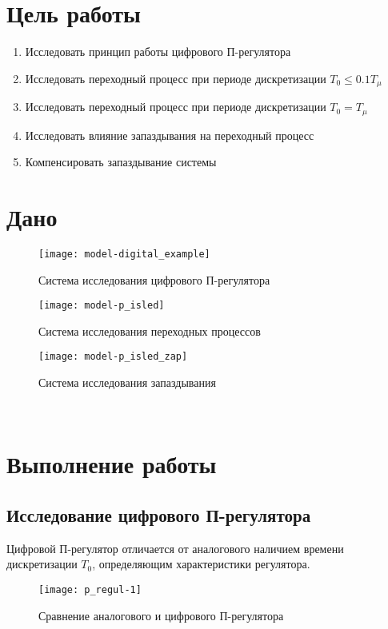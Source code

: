 


    
	\setcounter{page}{2}
    \section{Цель работы}
    \begin{enumerate}
        \item Исследовать принцип работы цифрового П-регулятора
        \item Исследовать переходный процесс при периоде дискретизации $T_0\leq0.1T_\mu$
        \item Исследовать переходный процесс при периоде дискретизации $T_0=T_\mu$
        \item Исследовать влияние запаздывания на переходный процесс
        \item Компенсировать запаздывание системы
    \end{enumerate}


    \section{Дано}
    \begin{figure}[H]
        \centering\texttt{[image: model-digital\_example]}
        \caption{Система исследования цифрового П-регулятора}
    \end{figure}
    \begin{figure}[H]
        \centering\texttt{[image: model-p\_isled]}
        \caption{Система исследования переходных процессов}
    \end{figure}
    \begin{figure}[H]
        \centering\texttt{[image: model-p\_isled\_zap]}
        \caption{Система исследования запаздывания}
    \end{figure}

    \begin{center}
        \noindent{}\\
    \end{center}


    \section{Выполнение работы}

    \subsection{Исследование цифрового П-регулятора}
    Цифровой П-регулятор отличается от аналогового наличием времени дискретизации $T_0$,
    определяющим характеристики регулятора.
    \begin{figure}[H]
        \centering\texttt{[image: p\_regul-1]}
        \caption{Сравнение аналогового и цифрового П-регулятора}
    \end{figure}

